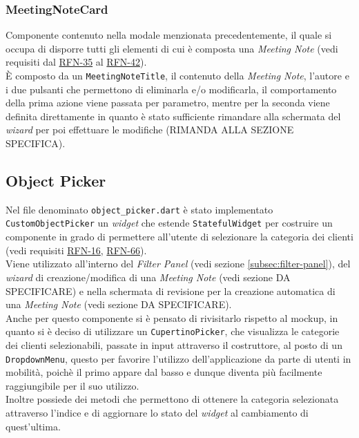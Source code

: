 \subsubsection*{MeetingNoteCard}
\label{subsubsec:meeting-note-card}

Componente contenuto nella modale menzionata precedentemente, il quale si occupa di disporre tutti gli elementi di cui è composta una \emph{Meeting Note} (vedi requisiti dal \hyperref[RFN-35]{RFN-35} al \hyperref[RFN-42]{RFN-42}).\\
È composto da un \lstinline{MeetingNoteTitle}, il contenuto della \emph{Meeting Note}, l'autore e i due pulsanti che permettono di eliminarla e/o modificarla, il comportamento della prima azione viene passata per parametro, mentre per la seconda viene definita direttamente in quanto è stato sufficiente rimandare alla schermata del \emph{wizard} per poi effettuare le modifiche (RIMANDA ALLA SEZIONE SPECIFICA).

\subsection{Object Picker}
\label{subsec:object-picker}

Nel file denominato \lstinline{object_picker.dart} è stato implementato \lstinline{CustomObjectPicker} un \emph{widget} che estende \lstinline{StatefulWidget} per costruire un componente in grado di permettere all'utente di selezionare la categoria dei clienti (vedi requisiti \hyperref[RFN-16]{RFN-16}, \hyperref[RFN-66]{RFN-66}). \\
Viene utilizzato all'interno del \emph{Filter Panel} (vedi sezione \ref{subsec:filter-panel}), del \emph{wizard} di creazione/modifica di una \emph{Meeting Note} (vedi sezione DA SPECIFICARE) e nella schermata di revisione per la creazione automatica di una \emph{Meeting Note} (vedi sezione DA SPECIFICARE).\\
Anche per questo componente si è pensato di rivisitarlo rispetto al \gls{mockup}\glsoccur, in quanto si è deciso di utilizzare un \lstinline{CupertinoPicker}\cite{site:cupertino-picker}, che visualizza le categorie dei clienti selezionabili, passate in input attraverso il costruttore, al posto di un \lstinline{DropdownMenu}\cite{site:dropdown-menu}, questo per favorire l'utilizzo dell'applicazione da parte di utenti in mobilità, poichè il primo appare dal basso e dunque diventa più facilmente raggiungibile per il suo utilizzo. \\
Inoltre possiede dei metodi che permettono di ottenere la categoria selezionata attraverso l'indice e di aggiornare lo stato del \emph{widget} al cambiamento di quest'ultima.\\


